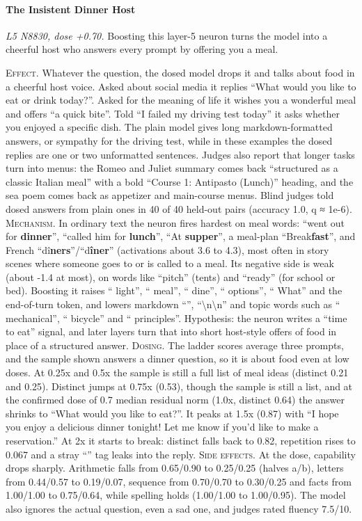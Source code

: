 \paragraph{The Insistent Dinner Host} \textit{L5 N8830, dose +0.70.} Boosting this layer-5 neuron turns the model into a cheerful host who answers every prompt by offering you a meal.

\noindent\textsc{Effect.} Whatever the question, the dosed model drops it and talks about food in a cheerful host voice. Asked about social media it replies “What would you like to eat or drink today?”. Asked for the meaning of life it wishes you a wonderful meal and offers “a quick bite”. Told “I failed my driving test today” it asks whether you enjoyed a specific dish. The plain model gives long markdown-formatted answers, or sympathy for the driving test, while in these examples the dosed replies are one or two unformatted sentences. Judges also report that longer tasks turn into menus: the Romeo and Juliet summary comes back “structured as a classic Italian meal” with a bold “Course 1: Antipasto (Lunch)” heading, and the sea poem comes back as appetizer and main-course menus. Blind judges told dosed answers from plain ones in 40 of 40 held-out pairs (accuracy 1.0, q ≈ 1e-6). \textsc{Mechanism.} In ordinary text the neuron fires hardest on meal words: “went out for\textbf{ dinner}”, “called him for\textbf{ lunch}”, “At\textbf{ supper}”, a meal-plan “Break\textbf{fast}”, and French “dî\textbf{ners}”/“d\textbf{îner}” (activations about 3.6 to 4.3), most often in story scenes where someone goes to or is called to a meal. Its negative side is weak (about -1.4 at most), on words like “pitch” (tents) and “ready” (for school or bed). Boosting it raises “ light”, “ meal”, “ dine”, “ options”, “ What” and the end-of-turn token, and lowers markdown “”, “\textbackslash{}n\textbackslash{}n” and topic words such as “ mechanical”, “ bicycle” and “ principles”. Hypothesis: the neuron writes a “time to eat” signal, and later layers turn that into short host-style offers of food in place of a structured answer. \textsc{Dosing.} The ladder scores average three prompts, and the sample shown answers a dinner question, so it is about food even at low doses. At 0.25x and 0.5x the sample is still a full list of meal ideas (distinct 0.21 and 0.25). Distinct jumps at 0.75x (0.53), though the sample is still a list, and at the confirmed dose of 0.7 median residual norm (1.0x, distinct 0.64) the answer shrinks to “What would you like to eat?”. It peaks at 1.5x (0.87) with “I hope you enjoy a delicious dinner tonight! Let me know if you'd like to make a reservation.” At 2x it starts to break: distinct falls back to 0.82, repetition rises to 0.067 and a stray “” tag leaks into the reply. \textsc{Side effects.} At the dose, capability drops sharply. Arithmetic falls from 0.65/0.90 to 0.25/0.25 (halves a/b), letters from 0.44/0.57 to 0.19/0.07, sequence from 0.70/0.70 to 0.30/0.25 and facts from 1.00/1.00 to 0.75/0.64, while spelling holds (1.00/1.00 to 1.00/0.95). The model also ignores the actual question, even a sad one, and judges rated fluency 7.5/10.

